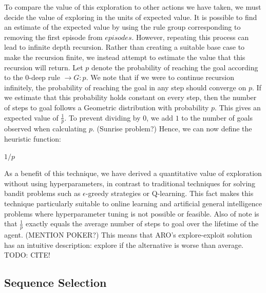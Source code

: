 \documentclass[letterpaper]{article} %
\begin{document}
To compare the value of this exploration to other actions we have taken, we must decide the value of exploring in the units of expected value.  It is possible to find an estimate of the expected value by using the rule group corresponding to removing the first episode from $episodes$. However, repeating this process can lead to infinite depth recursion. Rather than creating a suitable base case to make the recursion finite, we instead attempt to estimate the value that this recursion will return. Let $p$ denote the probability of reaching the goal according to the $0$-deep rule $\rightarrow G : p$. We note that if we were to continue recursion infinitely, the probability of reaching the goal in any step should converge on $p$. If we estimate that this probability holds constant on every step, then the number of steps to goal follows a Geometric distribution with probability $p$. This gives an expected value of $\frac{1}{p}$. To prevent dividing by $0$, we add $1$ to the number of goals observed when calculating $p$. (Sunrise problem?) Hence, we can now define the heuristic function:

\begin{algorithmic}[-1]
	
		\State \Return $1/p$
	\EndFunction
	
\end{algorithmic}

As a benefit of this technique, we have derived a quantitative value of exploration without using hyperparameters, in contrast to traditional techniques for solving bandit problems such as $\epsilon$-greedy strategies or Q-learning. This fact makes this technique particularly suitable to online learning and artificial general intelligence problems where hyperparameter tuning is not possible or feasible. Also of note is that $\frac{1}{p}$ exactly equals the average number of steps to goal over the lifetime of the agent. (MENTION POKER?) This means that ARO's explore-exploit solution has an intuitive description: explore if the alternative is worse than average. TODO: CITE!

\subsection{Sequence Selection}
\end{document}
